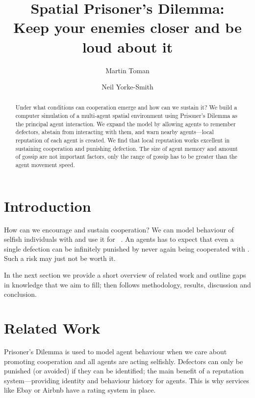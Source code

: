 \documentclass[runningheads]{llncs}
\begin{document}
%
\title{
Spatial Prisoner’s Dilemma: \\
Keep your enemies closer and be loud about it}
%
%
\author{
Martin Toman \and
Neil Yorke-Smith
}
%
%
%
\maketitle              %
%
%
%
\begin{abstract}
Under what conditions can cooperation emerge and how can we sustain it?
We build a computer simulation of a multi-agent spatial environment using Prisoner's Dilemma as the principal agent interaction.
We expand the model by allowing agents to remember defectors, abstain from interacting with them, and warn nearby agents---local reputation of each agent is created.
We find that local reputation works excellent in sustaining cooperation and punishing defection.
The size of agent memory and amount of gossip are not important factors,
only the range of gossip has to be greater than the agent movement speed.

\end{abstract}
%
%
%
\section{Introduction}

How can we encourage and sustain cooperation?
We can model behaviour of selfish individuals with 
and use it for ~\cite{Axelrod84}.
An agents has to expect that even a single defection can be infinitely punished by never again being cooperated with \cite{GRIM}.
Such a risk may just not be worth it.

In the next section we provide a short overview of related work and outline gaps in knowledge that we aim to fill; then follows methodology, results, discussion and conclusion.
%
%
%
\section{Related Work}
Prisoner's Dilemma is used to model agent behaviour when we care about promoting cooperation and all agents are acting selfishly.
Defectors can only be punished (or avoided) if they can be identified;
the main benefit of a reputation system---providing identity and behaviour history for agents.
This is why services like Ebay or Airbnb have a rating system in place.
\end{document}
